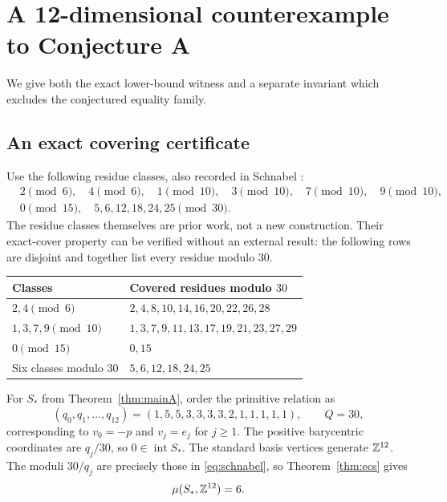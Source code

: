 \documentclass[11pt,a4paper]{article}
\theoremstyle{definition}\newtheorem{definition}[theorem]{Definition}
\theoremstyle{remark}\newtheorem{remark}[theorem]{Remark}
\DeclareMathOperator{\inter}{int}
\begin{document}
\section{A 12-dimensional counterexample to Conjecture A}
\label{sec:counterexample}
We give both the exact lower-bound witness and a separate invariant
which excludes the conjectured equality family.

\subsection{An exact covering certificate}
Use the following residue classes, also recorded in
Schnabel \cite[Example 3.1]{Schnabel}:
\begin{equation}\label{eq:schnabel}
\begin{split}
 &2\pmod6,\quad4\pmod6,\quad
 1\pmod{10},\quad3\pmod{10},\quad7\pmod{10},\quad9\pmod{10},\\
 &0\pmod{15},\quad
 5,6,12,18,24,25\pmod{30}.
\end{split}
\end{equation}
The residue classes themselves are prior work, not a new construction.
Their exact-cover property can be verified without an external result:
the following rows are disjoint and together list every residue modulo
$30$.
\begin{center}
\begin{tabular}{@{}ll@{}}
\toprule
Classes & Covered residues modulo $30$\\
\midrule
$2,4\pmod6$ & $2,4,8,10,14,16,20,22,26,28$\\
$1,3,7,9\pmod{10}$ & $1,3,7,9,11,13,17,19,21,23,27,29$\\
$0\pmod{15}$ & $0,15$\\
Six classes modulo $30$ & $5,6,12,18,24,25$\\
\bottomrule
\end{tabular}
\end{center}

For $S_*$ from Theorem~\ref{thm:mainA}, order the primitive relation
as
\[
 (q_0,q_1,\ldots,q_{12})=(1,5,5,3,3,3,3,2,1,1,1,1,1),
 \qquad Q=30,
\]
corresponding to $v_0=-p$ and $v_j=e_j$ for $j\ge1$.
The positive barycentric coordinates are $q_j/30$, so
$0\in\inter S_*$. The standard basis vertices generate
$\mathbb Z^{12}$. The moduli $30/q_j$ are precisely those in
\eqref{eq:schnabel}, so Theorem~\ref{thm:ecs} gives
\begin{equation}\label{eq:six}
 \mu(S_*,\mathbb Z^{12})=6.
\end{equation}
\end{document}
